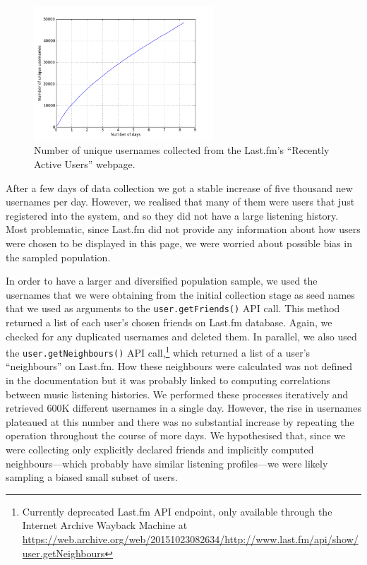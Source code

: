 \begin{figure}[h]
\centering
\includegraphics[width=0.60\textwidth]{username_scrappe1.png}
\caption[Number of unique usernames collected from Last.fm]{Number of unique usernames collected from the Last.fm's ``Recently Active Users'' webpage.}
\label{fig:username_scrappe}
\end{figure}

After a few days of data collection we got a stable increase of five thousand new usernames per day. However, we realised that many of them were users that just registered into the system, and so they did not have a large listening history. Most problematic, since Last.fm did not provide any information about how users were chosen to be displayed in this page, we were worried about possible bias in the sampled population.




In order to have a larger and diversified population sample, we used the usernames that we were obtaining from the initial collection stage as seed names that we used as arguments to the {\tt user.getFriends()} API call. This method returned a list of each user's chosen friends on Last.fm database. Again, we checked for any duplicated usernames and deleted them. 
In parallel, we also used the {\tt user.getNeighbours()} API call,\footnote{Currently deprecated Last.fm API endpoint, only available through the Internet Archive Wayback Machine at \url{https://web.archive.org/web/20151023082634/http://www.last.fm/api/show/user.getNeighbours}} which returned a list of a user's ``neighbours'' on Last.fm. How these neighbours were calculated  was not defined in the documentation but it was probably linked to computing correlations between music listening histories.
We performed these processes iteratively and retrieved 600K different usernames in a single day. However, the rise in usernames plateaued at this number and there was no substantial increase by repeating the operation throughout the course of more days. 
We hypothesised that, since we were collecting only explicitly declared friends and implicitly computed neighbours---which probably have similar listening profiles---we were likely sampling a biased small subset of users.


